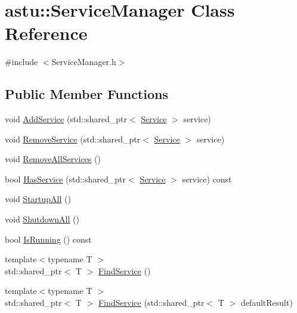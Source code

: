 \hypertarget{classastu_1_1ServiceManager}{}\section{astu\+:\+:Service\+Manager Class Reference}
\label{classastu_1_1ServiceManager}


{\ttfamily \#include $<$Service\+Manager.\+h$>$}

\subsection*{Public Member Functions}
\begin{DoxyCompactItemize}
\item 
void \hyperlink{classastu_1_1ServiceManager_a274475bef03cea4810f98082cdb24295}{Add\+Service} (std\+::shared\+\_\+ptr$<$ \hyperlink{classastu_1_1Service}{Service} $>$ service)
\item 
void \hyperlink{classastu_1_1ServiceManager_adbab5f4a6e042604e2c51eefcf69f7b5}{Remove\+Service} (std\+::shared\+\_\+ptr$<$ \hyperlink{classastu_1_1Service}{Service} $>$ service)
\item 
void \hyperlink{classastu_1_1ServiceManager_ad94c3984be162a0d4e3633abd8b81099}{Remove\+All\+Services} ()
\item 
bool \hyperlink{classastu_1_1ServiceManager_ab8af7a024cea64d9f4f4431360641b16}{Has\+Service} (std\+::shared\+\_\+ptr$<$ \hyperlink{classastu_1_1Service}{Service} $>$ service) const
\item 
void \hyperlink{classastu_1_1ServiceManager_a7d4918c435a26a4212902ade5f9829b6}{Startup\+All} ()
\item 
void \hyperlink{classastu_1_1ServiceManager_a0ec3c06392ae4e7dab8d4b550bed1699}{Shutdown\+All} ()
\item 
bool \hyperlink{classastu_1_1ServiceManager_a64cea7132b9be6521a9af6f76009e5d4}{Is\+Running} () const
\item 
{\footnotesize template$<$typename T $>$ }\\std\+::shared\+\_\+ptr$<$ T $>$ \hyperlink{classastu_1_1ServiceManager_acef5ab6b48a9811b810851c69751f71a}{Find\+Service} ()
\item 
{\footnotesize template$<$typename T $>$ }\\std\+::shared\+\_\+ptr$<$ T $>$ \hyperlink{classastu_1_1ServiceManager_a3000933260f102748f75c9b4064fd119}{Find\+Service} (std\+::shared\+\_\+ptr$<$ T $>$ default\+Result)
\end{DoxyCompactItemize}
